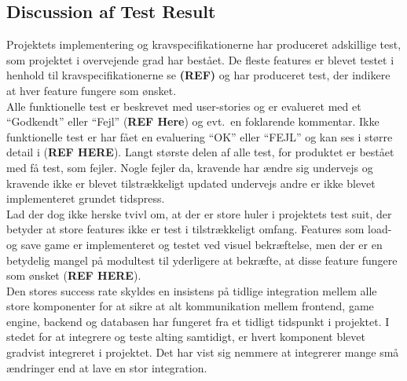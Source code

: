\subsection{Discussion af Test Result}
Projektets implementering og kravspecifikationerne har produceret adskillige test, som 
projektet i overvejende grad har bestået. De fleste features er blevet
testet i henhold til kravspecifikationerne se \textbf{(REF)} og har produceret 
test, der indikere at hver feature fungere som ønsket. \\

Alle funktionelle test er beskrevet med user-stories og er evalueret med et ``Godkendt''
eller ``Fejl'' (\textbf{REF Here}) og evt.\ en foklarende kommentar. Ikke funktionelle 
test er har fået en evaluering ``OK'' eller ``FEJL'' og kan ses i større detail i (\textbf{REF HERE}).
Langt største delen af alle test, for produktet er bestået med få test, som fejler. 
Nogle fejler da, kravende har ændre sig undervejs og kravende ikke er blevet tilstrækkeligt
updated undervejs andre er ikke blevet implementeret grundet tidspress. \\

Lad der dog ikke herske tvivl om, at der er store huler i projektets test suit, der
betyder at store features ikke er test i tilstrækkeligt omfang. Features som load- og save
game er implementeret og testet ved visuel bekræftelse, men der er en betydelig mangel på
modultest til yderligere at bekræfte, at disse feature fungere som ønsket (\textbf{REF HERE}). \\

Den stores success rate skyldes en insistens på tidlige integration mellem alle store komponenter for at sikre at alt
kommunikation mellem frontend, game engine, backend og databasen har fungeret fra et tidligt tidspunkt i projektet.
I stedet for at integrere og teste alting samtidigt, er hvert komponent blevet gradvist integreret i
projektet. Det har vist sig nemmere at integrerer mange små ændringer end at lave en stor integration.



